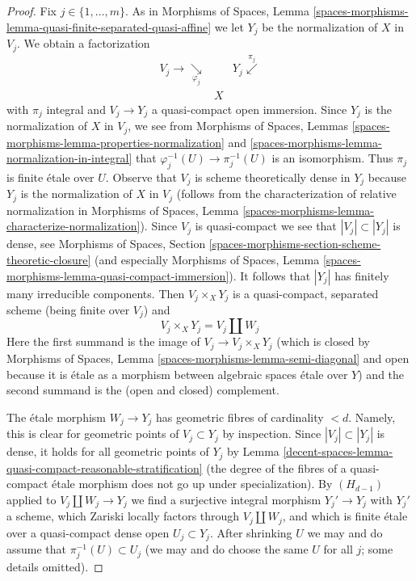 \begin{proof}
\medskip\noindent
Fix $j \in \{1, \ldots, m\}$.
As in Morphisms of Spaces, Lemma
\ref{spaces-morphisms-lemma-quasi-finite-separated-quasi-affine}
we let $Y_j$ be the normalization of $X$ in $V_j$. We obtain a factorization
$$
\begin{array}{ccc}V_j \longrightarrow\underset{\varphi_j}{\searrow} &  & Y_j \overset{\pi_j}{\swarrow} \\  & X & \end{array}
$$
with $\pi_j$ integral and $V_j \to Y_j$ a quasi-compact open immersion. Since
$Y_j$ is the normalization of $X$ in $V_j$, we see from
Morphisms of Spaces, Lemmas
\ref{spaces-morphisms-lemma-properties-normalization} and
\ref{spaces-morphisms-lemma-normalization-in-integral}
that $\varphi_j^{-1}(U) \to \pi_j^{-1}(U)$ is an isomorphism.
Thus $\pi_j$ is finite \'etale over $U$. Observe that $V_j$
is scheme theoretically dense in $Y_j$ because $Y_j$ is the normalization
of $X$ in $V_j$ (follows from the characterization of relative normalization
in Morphisms of Spaces, Lemma
\ref{spaces-morphisms-lemma-characterize-normalization}). Since $V_j$
is quasi-compact we see that $|V_j| \subset |Y_j|$ is dense,
see Morphisms of Spaces, Section
\ref{spaces-morphisms-section-scheme-theoretic-closure}
(and especially Morphisms of Spaces, Lemma
\ref{spaces-morphisms-lemma-quasi-compact-immersion}).
It follows that $|Y_j|$ has finitely many irreducible components.
Then $V_j \times_X Y_j$ is a quasi-compact, separated scheme
(being finite over $V_j$) and
$$
V_j \times_X Y_j = V_j \amalg W_j
$$
Here the first summand is the image of $V_j \to V_j \times_X Y_j$
(which is closed by
Morphisms of Spaces, Lemma \ref{spaces-morphisms-lemma-semi-diagonal}
and open because it is \'etale as a morphism between
algebraic spaces \'etale over $Y$) and
the second summand is the (open and closed) complement.

\medskip\noindent
The \'etale morphism $W_j \to Y_j$ has geometric fibres of cardinality $< d$.
Namely, this is clear for geometric points of $V_j \subset Y_j$ by inspection.
Since $|V_j| \subset |Y_j|$ is dense, it holds for all geometric points
of $Y_j$ by Lemma \ref{decent-spaces-lemma-quasi-compact-reasonable-stratification}
(the degree of the fibres of a quasi-compact \'etale morphism
does not go up under specialization). By $(H_{d - 1})$ applied
to $V_j \amalg W_j \to Y_j$ we find a surjective integral morphism
$Y_j' \to Y_j$ with $Y_j'$ a scheme, which Zariski locally factors
through $V_j \amalg W_j$, and which is finite \'etale over a
quasi-compact dense open $U_j \subset Y_j$. After shrinking $U$
we may and do assume that $\pi_j^{-1}(U) \subset U_j$
(we may and do choose the same $U$ for all $j$; some details omitted).


\end{proof}
